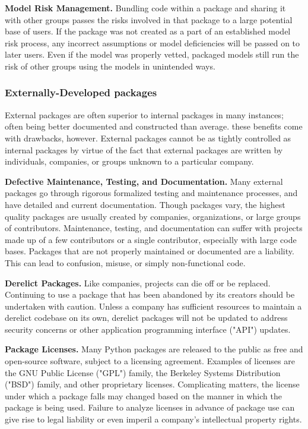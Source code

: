                 \textbf{Model Risk Management.}
                Bundling code within a package and sharing it with other groups passes the risks involved in that package to a large potential base of users. If the package was not created as a part of an established model risk process, any incorrect assumptions or model deficiencies will be passed on to later users. Even if the model was properly vetted, packaged models still run the risk of other groups using the models in unintended ways. 
                
            \subsubsection{Externally-Developed packages}

                External packages are often superior to internal packages in many instances; often being better documented and constructed than average. these benefits come with drawbacks, however. External packages cannot be as tightly controlled as internal packages by virtue of the fact that external packages are written by individuals, companies, or groups unknown to a particular company.

                \textbf{Defective Maintenance, Testing, and Documentation.}
                Many external packages go through rigorous formalized testing and maintenance processes, and have detailed and current documentation. Though packages vary, the highest quality packages are usually created by companies, organizations, or large groups of contributors. Maintenance, testing, and documentation can suffer with projects made up of a few contributors or a single contributor, especially with large code bases. Packages that are not properly maintained or documented are a liability. This can lead to confusion, misuse, or simply non-functional code.

                \textbf{Derelict Packages.}
                Like companies, projects can die off or be replaced. Continuing to use a package that has been abandoned by its creators should be undertaken with caution. Unless a company has sufficient resources to maintain a derelict codebase on its own, derelict packages will not be updated to address security concerns or other application programming interface ("API") updates.

                \textbf{Package Licenses.}
                Many Python packages are released to the public as free and open-source software, subject to a licensing agreement. Examples of licenses are the GNU Public License ("GPL") family, the Berkeley Systems Distribution ("BSD") family, and other proprietary licenses. Complicating matters, the license under which a package falls may changed based on the manner in which the package is being used. Failure to analyze licenses in advance of package use can give rise to legal liability or even imperil a company's intellectual property rights.

